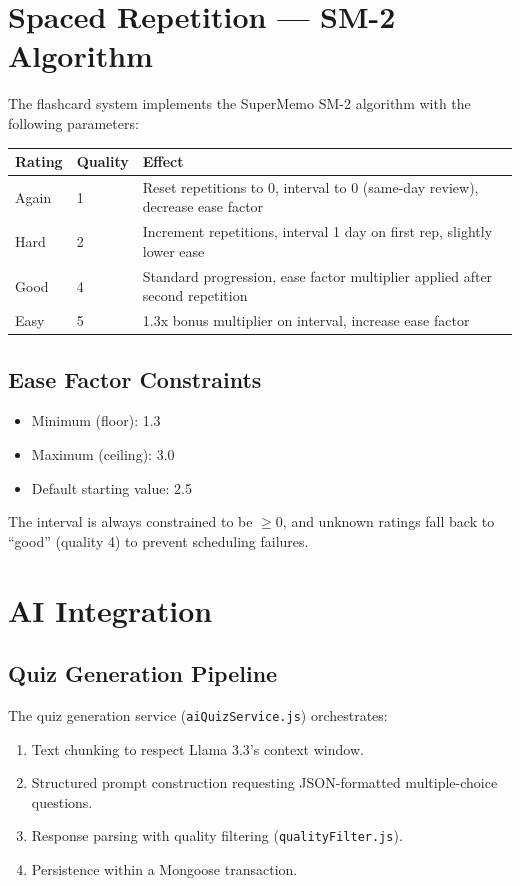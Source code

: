 \documentclass[12pt,a4paper]{article}
\begin{document}
\section{Spaced Repetition --- SM-2 Algorithm}

The flashcard system implements the SuperMemo SM-2 algorithm with the following parameters:

\begin{longtable}{p{3cm} p{3cm} p{8cm}}
\toprule
\textbf{Rating} & \textbf{Quality} & \textbf{Effect} \\
\midrule
Again & 1 & Reset repetitions to 0, interval to 0 (same-day review), decrease ease factor \\
Hard & 2 & Increment repetitions, interval 1 day on first rep, slightly lower ease \\
Good & 4 & Standard progression, ease factor multiplier applied after second repetition \\
Easy & 5 & 1.3x bonus multiplier on interval, increase ease factor \\
\bottomrule
\end{longtable}

\subsection{Ease Factor Constraints}
\begin{itemize}[leftmargin=1.5cm]
    \item Minimum (floor): 1.3
    \item Maximum (ceiling): 3.0
    \item Default starting value: 2.5
\end{itemize}

The interval is always constrained to be $\geq 0$, and unknown ratings fall back to ``good'' (quality 4) to prevent scheduling failures.

\section{AI Integration}

\subsection{Quiz Generation Pipeline}
The quiz generation service (\texttt{aiQuizService.js}) orchestrates:
\begin{enumerate}[leftmargin=1.5cm]
    \item Text chunking to respect Llama 3.3's context window.
    \item Structured prompt construction requesting JSON-formatted multiple-choice questions.
    \item Response parsing with quality filtering (\texttt{qualityFilter.js}).
    \item Persistence within a Mongoose transaction.
\end{enumerate}
\end{document}
